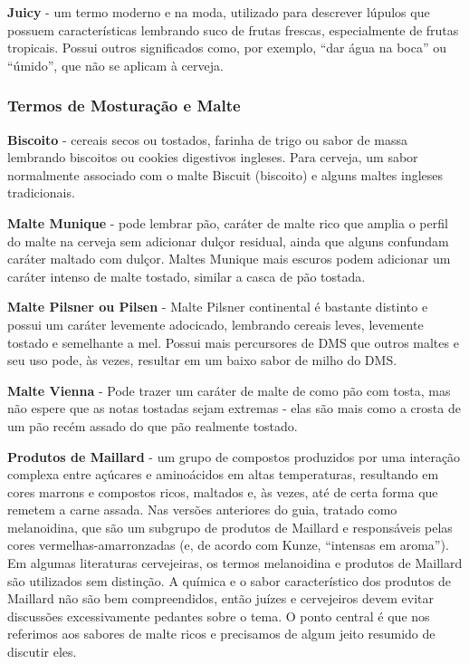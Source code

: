 \textbf{Juicy} - um termo moderno e na moda, utilizado para descrever lúpulos que possuem características lembrando suco de frutas frescas, especialmente de frutas tropicais. Possui outros significados como, por exemplo, “dar água na boca” ou “úmido”, que não se aplicam à cerveja.

\subsubsection*{Termos de Mosturação e Malte}
\textbf{Biscoito} - cereais secos ou tostados, farinha de trigo ou sabor de massa lembrando biscoitos ou cookies digestivos ingleses. Para cerveja, um sabor normalmente associado com o malte Biscuit (biscoito) e alguns maltes ingleses tradicionais.

\textbf{Malte Munique} - pode lembrar pão, caráter de malte rico que amplia o perfil do malte na cerveja sem adicionar dulçor residual, ainda que alguns confundam caráter maltado com dulçor. Maltes Munique mais escuros podem adicionar um caráter intenso de malte tostado, similar a casca de pão tostada.

\textbf{Malte Pilsner ou Pilsen} - Malte Pilsner continental é bastante distinto e possui um caráter levemente adocicado, lembrando cereais leves, levemente tostado e semelhante a mel. Possui mais percursores de DMS que outros maltes e seu uso pode, às vezes, resultar em um baixo sabor de milho do DMS.

\textbf{Malte Vienna} - Pode trazer um caráter de malte de como pão com tosta, mas não espere que as notas tostadas sejam extremas - elas são mais como a crosta de um pão recém assado do que pão realmente tostado.

\textbf{Produtos de Maillard} - um grupo de compostos produzidos por uma interação complexa entre açúcares e aminoácidos em altas temperaturas, resultando em cores marrons e compostos ricos, maltados e, às vezes, até de certa forma que remetem a carne assada. Nas versões anteriores do guia, tratado como melanoidina, que são um subgrupo de produtos de Maillard e responsáveis pelas cores vermelhas-amarronzadas (e, de acordo com Kunze, “intensas em aroma”). Em algumas literaturas cervejeiras, os termos melanoidina e produtos de Maillard são utilizados sem distinção. A química e o sabor característico dos produtos de Maillard não são bem compreendidos, então juízes e cervejeiros devem evitar discussões excessivamente pedantes sobre o tema. O ponto central é que nos referimos aos sabores de malte ricos e precisamos de algum jeito resumido de discutir eles.

